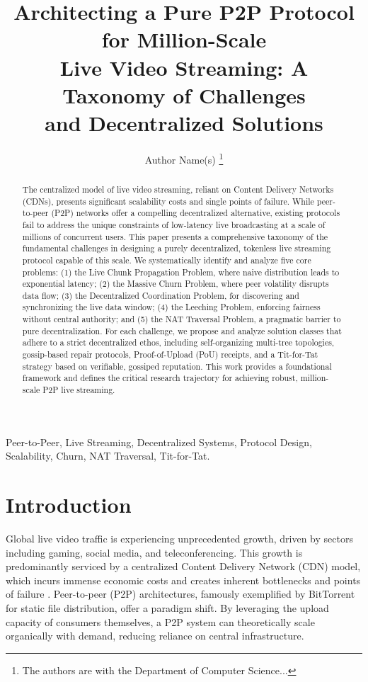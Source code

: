 \documentclass[journal]{IEEEtran}
\begin{document}
\title{Architecting a Pure P2P Protocol for Million-Scale\\Live Video Streaming: A Taxonomy of Challenges\\and Decentralized Solutions}

\author{Author Name(s)%
\thanks{The authors are with the Department of Computer Science...}}

\maketitle

\begin{abstract}
The centralized model of live video streaming, reliant on Content Delivery Networks (CDNs), presents significant scalability costs and single points of failure. While peer-to-peer (P2P) networks offer a compelling decentralized alternative, existing protocols fail to address the unique constraints of low-latency live broadcasting at a scale of millions of concurrent users. This paper presents a comprehensive taxonomy of the fundamental challenges in designing a purely decentralized, tokenless live streaming protocol capable of this scale. We systematically identify and analyze five core problems: (1) the Live Chunk Propagation Problem, where naive distribution leads to exponential latency; (2) the Massive Churn Problem, where peer volatility disrupts data flow; (3) the Decentralized Coordination Problem, for discovering and synchronizing the live data window; (4) the Leeching Problem, enforcing fairness without central authority; and (5) the NAT Traversal Problem, a pragmatic barrier to pure decentralization. For each challenge, we propose and analyze solution classes that adhere to a strict decentralized ethos, including self-organizing multi-tree topologies, gossip-based repair protocols, Proof-of-Upload (PoU) receipts, and a Tit-for-Tat strategy based on verifiable, gossiped reputation. This work provides a foundational framework and defines the critical research trajectory for achieving robust, million-scale P2P live streaming.
\end{abstract}

\begin{IEEEkeywords}
Peer-to-Peer, Live Streaming, Decentralized Systems, Protocol Design, Scalability, Churn, NAT Traversal, Tit-for-Tat.
\end{IEEEkeywords}

\section{Introduction}
Global live video traffic is experiencing unprecedented growth, driven by sectors including gaming, social media, and teleconferencing. This growth is predominantly serviced by a centralized Content Delivery Network (CDN) model, which incurs immense economic costs and creates inherent bottlenecks and points of failure \cite{smith2022economics}. Peer-to-peer (P2P) architectures, famously exemplified by BitTorrent \cite{cohen2003incentives} for static file distribution, offer a paradigm shift. By leveraging the upload capacity of consumers themselves, a P2P system can theoretically scale organically with demand, reducing reliance on central infrastructure.
\end{document}

